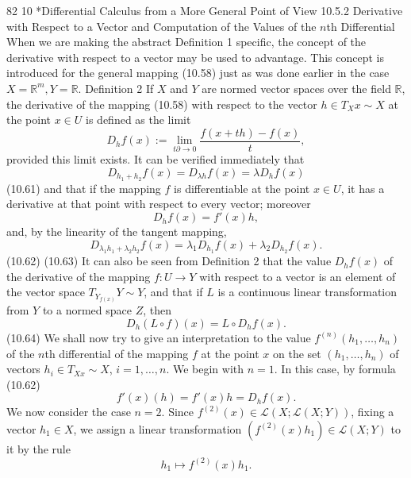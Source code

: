 82
10 *Differential Calculus from a More General Point of View
10.5.2 Derivative with Respect to a Vector and Computation
of the Values of the $n$th Differential
When we are making the abstract Definition 1 specific, the concept of the derivative
with respect to a vector may be used to advantage. This concept is introduced for
the general mapping (10.58) just as was done earlier in the case $X = \mathbb{R}^m, Y = \mathbb{R}$.
Definition 2 If $X$ and $Y$ are normed vector spaces over the field $\mathbb{R}$, the derivative
of the mapping (10.58) with respect to the vector $h \in T_Xx \sim X$ at the point $x \in U$
is defined as the limit
$$D_h f (x) := \lim_{t\partial\to 0} \frac{f (x + th) − f (x)}{t},$$
provided this limit exists.
It can be verified immediately that
$$D_{h_1+h_2} f (x) = D_{\lambda h} f (x) = \lambda D_h f (x)$$
(10.61)
and that if the mapping $f$ is differentiable at the point $x \in U$, it has a derivative at
that point with respect to every vector; moreover
$$D_h f (x) = f'(x)h,$$
and, by the linearity of the tangent mapping,
$$D_{\lambda_1 h_1+\lambda_2 h_2} f(x) = \lambda_1 D_{h_1} f (x) + \lambda_2 D_{h_2} f (x).$$
(10.62)
(10.63)
It can also be seen from Definition 2 that the value $D_h f (x)$ of the derivative of
the mapping $f : U \to Y$ with respect to a vector is an element of the vector space
$T_{Y_{f(x)}}Y \sim Y$, and that if $L$ is a continuous linear transformation from $Y$ to a normed
space $Z$, then
$$D_h(L\circ f)(x) = L \circ D_h f (x).$$
(10.64)
We shall now try to give an interpretation to the value $f^{(n)} (h_1,\ldots, h_n)$ of the
$n$th differential of the mapping $f$ at the point $x$ on the set $(h_1,\ldots,h_n)$ of vectors
$h_i \in T_{Xx} \sim X$, $i = 1, \ldots, n$.
We begin with $n = 1$. In this case, by formula (10.62)
$$f'(x)(h) = f'(x)h = D_h f (x).$$
We now consider the case $n = 2$. Since $f^{(2)} (x) \in \mathcal{L}(X; \mathcal{L}(X; Y))$, fixing a vector
$h_1 \in X$, we assign a linear transformation $(f^{(2)}(x)h_1) \in \mathcal{L}(X; Y)$ to it by the rule
$$h_1\mapsto f^{(2)}(x)h_1.$$